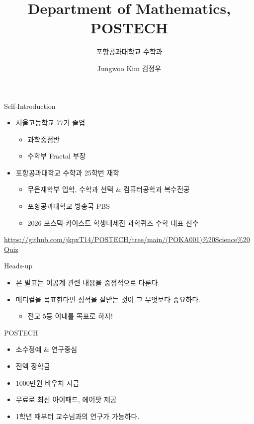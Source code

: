\documentclass[12pt,aspectratio=169]{beamer}
\title[Department of Mathematics]{Department of Mathematics, POSTECH}
\subtitle{포항공과대학교 수학과}
\author[Jungwoo Kim]{Jungwoo Kim 김정우}
\institute[POSTECH]{Department of Mathematics, POSTECH\\\texttt{@jkpxt14} \quad \texttt{jkpxt14@postech.ac.kr}}
\date{}
\newenvironment{mainitemize}{\begin{itemize}\setlength{\itemsep}{0.72em}}{\end{itemize}}
\newenvironment{subitemize}{\begin{itemize}\setlength{\itemsep}{0.22em}}{\end{itemize}}
\newcommand{\smallurl}[1]{{\scriptsize\url{#1}}}
\begin{document}
\begin{frame}
  \titlepage
\end{frame}

\begin{frame}{Self-Introduction}
\begin{mainitemize}
  \item 서울고등학교 77기 졸업
    \begin{subitemize}
      \item 과학중점반
      \item 수학부 Fractal 부장
    \end{subitemize}
  \item 포항공과대학교 수학과 25학번 재학
    \begin{subitemize}
      \item 무은재학부 입학, 수학과 선택 \& 컴퓨터공학과 복수전공
      \item 포항공과대학교 방송국 PBS
      \item 2026 포스텍-카이스트 학생대제전 과학퀴즈 수학 대표 선수
    \end{subitemize}
\end{mainitemize}
\vspace{0.25em}
\smallurl{https://github.com/jkpxT14/POSTECH/tree/main/(POKA001)\%20Science\%20Quiz}
\end{frame}

\begin{frame}{Heads-up}
\begin{mainitemize}
  \item 본 발표는 이공계 관련 내용을 중점적으로 다룬다.
  \item 메디컬을 목표한다면 성적을 잘받는 것이 그 무엇보다 중요하다.
    \begin{subitemize}
      \item 전교 5등 이내를 목표로 하자!
    \end{subitemize}
\end{mainitemize}
\end{frame}

\begin{frame}{POSTECH}
\begin{mainitemize}
  \item 소수정예 \& 연구중심
  \item 전액 장학금
  \item 1000만원 바우처 지급
  \item 무료로 최신 아이패드, 에어팟 제공
  \item 1학년 때부터 교수님과의 연구가 가능하다.
\end{mainitemize}
\end{frame}
\end{document}
